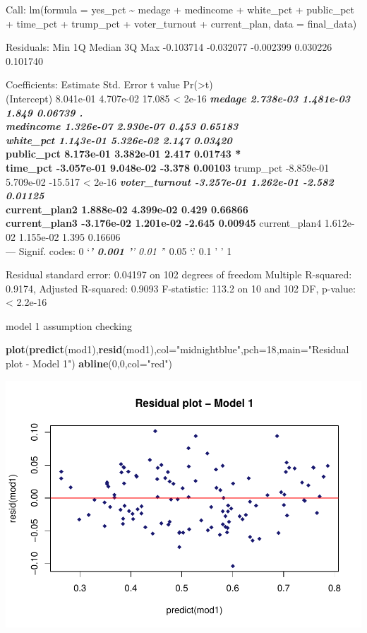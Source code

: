 \documentclass[
]{article}
\newenvironment{Shaded}{\begin{snugshade}}{\end{snugshade}}
\newcommand{\DataTypeTok}[1]{\textcolor[rgb]{0.13,0.29,0.53}{#1}}
\newcommand{\DecValTok}[1]{\textcolor[rgb]{0.00,0.00,0.81}{#1}}
\newcommand{\KeywordTok}[1]{\textcolor[rgb]{0.13,0.29,0.53}{\textbf{#1}}}
\newcommand{\NormalTok}[1]{#1}
\newcommand{\StringTok}[1]{\textcolor[rgb]{0.31,0.60,0.02}{#1}}
\begin{document}
Call: lm(formula = yes\_pct \textasciitilde{} medage + medincome +
white\_pct + public\_pct + time\_pct + trump\_pct + voter\_turnout +
current\_plan, data = final\_data)

Residuals: Min 1Q Median 3Q Max -0.103714 -0.032077 -0.002399 0.030226
0.101740

Coefficients: Estimate Std. Error t value
Pr(\textgreater\textbar t\textbar)\\
(Intercept) 8.041e-01 4.707e-02 17.085 \textless{} 2e-16 \textbf{\emph{
medage 2.738e-03 1.481e-03 1.849 0.06739 .\\
medincome 1.326e-07 2.930e-07 0.453 0.65183\\
white\_pct 1.143e-01 5.326e-02 2.147 0.03420 }\\
public\_pct 8.173e-01 3.382e-01 2.417 0.01743 *\\
time\_pct -3.057e-01 9.048e-02 -3.378 0.00103 } trump\_pct -8.859e-01
5.709e-02 -15.517 \textless{} 2e-16 \textbf{\emph{ voter\_turnout
-3.257e-01 1.262e-01 -2.582 0.01125 }\\
current\_plan2 1.888e-02 4.399e-02 0.429 0.66866\\
current\_plan3 -3.176e-02 1.201e-02 -2.645 0.00945 } current\_plan4
1.612e-02 1.155e-02 1.395 0.16606\\
--- Signif. codes: 0 `\emph{\textbf{' 0.001 '}' 0.01 '}' 0.05 `.' 0.1 '
' 1

Residual standard error: 0.04197 on 102 degrees of freedom Multiple
R-squared: 0.9174, Adjusted R-squared: 0.9093 F-statistic: 113.2 on 10
and 102 DF, p-value: \textless{} 2.2e-16

model 1 assumption checking

\begin{Shaded}
\begin{Highlighting}[]
\KeywordTok{plot}\NormalTok{(}\KeywordTok{predict}\NormalTok{(mod1),}\KeywordTok{resid}\NormalTok{(mod1),}\DataTypeTok{col=}\StringTok{"midnightblue"}\NormalTok{,}\DataTypeTok{pch=}\DecValTok{18}\NormalTok{,}\DataTypeTok{main=}\StringTok{"Residual plot - Model 1"}\NormalTok{)}
\KeywordTok{abline}\NormalTok{(}\DecValTok{0}\NormalTok{,}\DecValTok{0}\NormalTok{,}\DataTypeTok{col=}\StringTok{"red"}\NormalTok{)}
\end{Highlighting}
\end{Shaded}

\includegraphics{Zhong_paper_files/figure-latex/unnamed-chunk-3-1.pdf}
\end{document}
